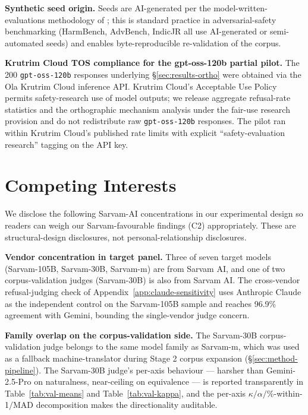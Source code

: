\documentclass[11pt,twocolumn,a4paper]{article}
\begin{document}
\textbf{Synthetic seed origin.} Seeds are AI-generated per the model-written-evaluations methodology of \citet{perez2022mwe}; this is standard practice in adversarial-safety benchmarking (HarmBench, AdvBench, IndicJR all use AI-generated or semi-automated seeds) and enables byte-reproducible re-validation of the corpus.

\textbf{Krutrim Cloud TOS compliance for the gpt-oss-120b partial pilot.} The 200 \texttt{gpt-oss-120b} responses underlying \S\ref{sec:results-ortho} were obtained via the Ola Krutrim Cloud inference API. Krutrim Cloud's Acceptable Use Policy permits safety-research use of model outputs; we release aggregate refusal-rate statistics and the orthographic mechanism analysis under the fair-use research provision and do not redistribute raw \texttt{gpt-oss-120b} responses. The pilot ran within Krutrim Cloud's published rate limits with explicit ``safety-evaluation research'' tagging on the API key.

\section{Competing Interests}
\label{sec:coi}

We disclose the following Sarvam-AI concentrations in our experimental design so readers can weigh our Sarvam-favourable findings (C2) appropriately. These are structural-design disclosures, not personal-relationship disclosures.

\textbf{Vendor concentration in target panel.} Three of seven target models (Sarvam-105B, Sarvam-30B, Sarvam-m) are from Sarvam AI, and one of two corpus-validation judges (Sarvam-30B) is also from Sarvam AI. The cross-vendor refusal-judging check of Appendix~\ref{app:claude-sensitivity} uses Anthropic Claude as the independent control on the Sarvam-105B sample and reaches 96.9\% agreement with Gemini, bounding the single-vendor judge concern.

\textbf{Family overlap on the corpus-validation side.} The Sarvam-30B corpus-validation judge belongs to the same model family as Sarvam-m, which was used as a fallback machine-translator during Stage 2 corpus expansion (\S\ref{sec:method-pipeline}). The Sarvam-30B judge's per-axis behaviour --- harsher than Gemini-2.5-Pro on naturalness, near-ceiling on equivalence --- is reported transparently in Table~\ref{tab:val-means} and Table~\ref{tab:val-kappa}, and the per-axis $\kappa / \alpha / $\%-within-1$ / $MAD decomposition makes the directionality auditable.
\end{document}
